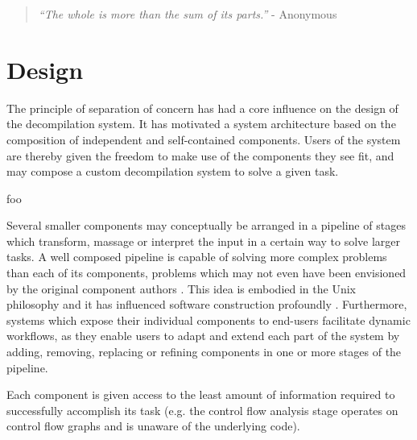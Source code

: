 
%

\begin{quote}
	\textit{``The whole is more than the sum of its parts.''} - Anonymous
\end{quote}

\section{Design}
\label{sec:design}


The principle of separation of concern has had a core influence on the design of the decompilation system. It has motivated a system architecture based on the composition of independent and self-contained components. Users of the system are thereby given the freedom to make use of the components they see fit, and may compose a custom decompilation system to solve a given task.

foo

Several smaller components may conceptually be arranged in a pipeline of stages which transform, massage or interpret the input in a certain way to solve larger tasks. A well composed pipeline is capable of solving more complex problems than each of its components, problems which may not even have been envisioned by the original component authors \cite{simplicity_and_collaboration}. This idea is embodied in the Unix philosophy and it has influenced software construction profoundly \cite{art_of_unix}. Furthermore, systems which expose their individual components to end-users facilitate dynamic workflows, as they enable users to adapt and extend each part of the system by adding, removing, replacing or refining
components in one or more stages of the pipeline.

Each component is given access to the least amount of information required to successfully accomplish its task (e.g. the control flow analysis stage operates on control flow graphs and is unaware of the underlying code).


